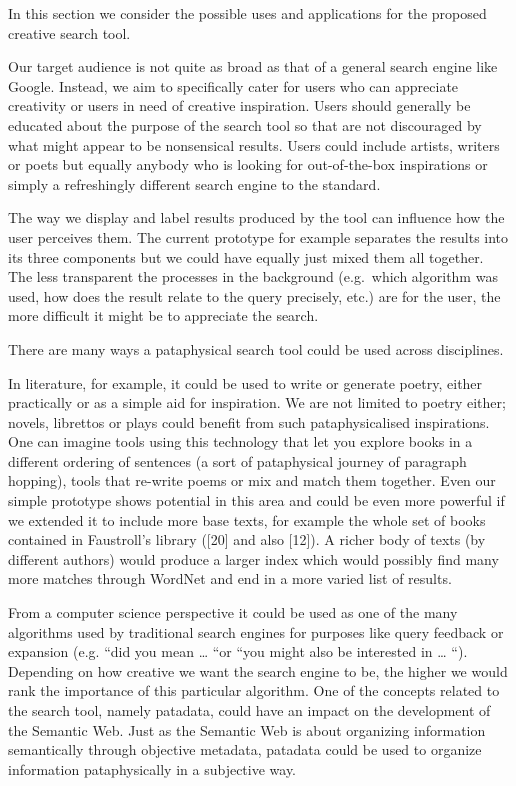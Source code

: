 \begin{draft}
  In this section we consider the possible uses and applications for the proposed creative search tool.

  Our target audience is not quite as broad as that of a general search engine like Google. Instead, we aim to specifically cater for users who can appreciate creativity or users in need of creative inspiration. Users should generally be educated about the purpose of the search tool so that are not discouraged by what might appear to be nonsensical results. Users could include artists, writers or poets but equally anybody who is looking for out-of-the-box inspirations or simply a refreshingly different search engine to the standard.

  The way we display and label results produced by the tool can influence how the user perceives them. The current prototype for example separates the results into its three components but we could have equally just mixed them all together. The less transparent the processes in the background (e.g.\ which algorithm was used, how does the result relate to the query precisely, etc.) are for the user, the more difficult it might be to appreciate the search.

  There are many ways a pataphysical search tool could be used across disciplines.

  In literature, for example, it could be used to write or generate poetry, either practically or as a simple aid for inspiration. We are not limited to poetry either; novels, librettos or plays could benefit from such pataphysicalised inspirations. One can imagine tools using this technology that let you explore books in a different ordering of sentences (a sort of pataphysical journey of paragraph hopping), tools that re-write poems or mix and match them together. Even our simple prototype shows potential in this area and could be even more powerful if we extended it to include more base texts, for example the whole set of books contained in Faustroll’s library ([20] and also [12]). A richer body of texts (by different authors) would produce a larger index which would possibly find many more matches through WordNet and end in a more varied list of results.

  From a computer science perspective it could be used as one of the many algorithms used by traditional search engines for purposes like query feedback or expansion (e.g. “did you mean … “or “you might also be interested in … “). Depending on how creative we want the search engine to be, the higher we would rank the importance of this particular algorithm. One of the concepts related to the search tool, namely patadata, could have an impact on the development of the Semantic Web. Just as the Semantic Web is about organizing information semantically through objective metadata, patadata could be used to organize information pataphysically in a subjective way.


\end{draft}
